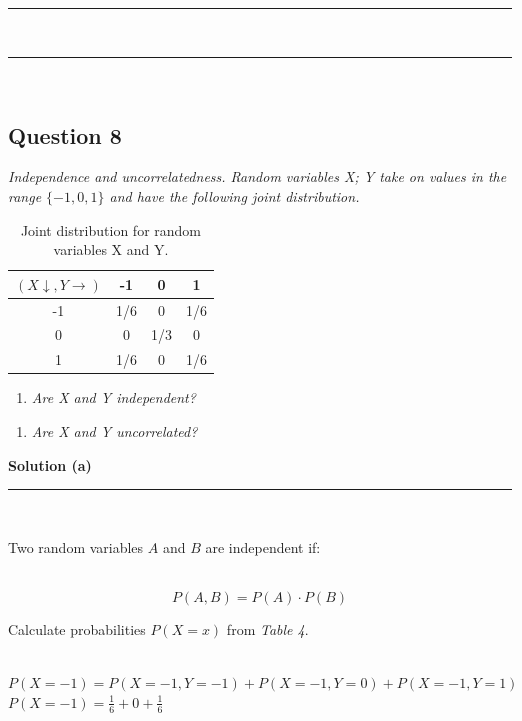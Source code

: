 \documentclass{article}
\begin{document}
\noindent\rule{\textwidth}{0.4pt}\\

\noindent\rule{\textwidth}{0.4pt}\\

\newpage

\subsection*{Question 8}
\textit{Independence and uncorrelatedness. Random variables X; Y take on values in the range $\{-1,0,1\}$ and have the following joint distribution.}\\

\begin{table}[h]
\centering
\begin{tabular}{c|ccc}
$(X\downarrow ,Y \rightarrow)$ & -1 & 0 & 1 \\ \hline
-1 & 1/6 & 0 & 1/6 \\
0 & 0 & 1/3 & 0 \\
1 & 1/6 & 0 & 1/6 \\
\end{tabular}
\caption{Joint distribution for random variables X and Y.}
\label{tab:example_fractions}
\end{table}

\begin{enumerate}[label=(a)]
  \item \textit{Are X and Y independent?}
\end{enumerate}

\begin{enumerate}[label=(b)]
  \item \textit{Are X and Y uncorrelated?}
\end{enumerate}

\textbf{Solution (a)}

\noindent\rule{\textwidth}{0.4pt}\\

\parbox{\textwidth}{Two random variables $A$ and $B$ are independent if:}\\

$$P(A, B) = P(A) \cdot P(B)$$


\parbox{\textwidth}{Calculate probabilities $P(X = x)$ from \textit{Table 4}.}\\

$P(X = -1) = P(X = -1, Y = -1) + P(X = -1, Y = 0) + P(X = -1, Y = 1)$\\

$P(X = -1) = \frac{1}{6} + 0 + \frac{1}{6}$ \\
\end{document}

